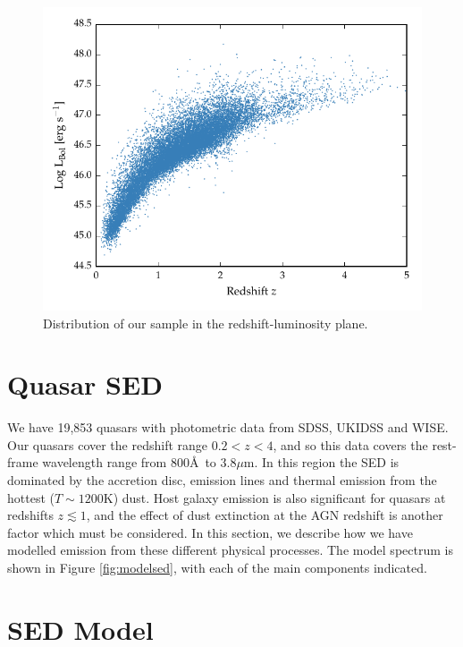 \begin{figure}
  \centering
  \includegraphics[width=\textwidth]{figures/chapter05/lum_z.pdf}
  \caption{Distribution of our sample in the redshift-luminosity plane.}
  \label{fig:lum_z}
\end{figure}


\section{Quasar SED}

We have 19,853 quasars with photometric data from SDSS, UKIDSS and WISE. 
Our quasars cover the redshift range $0.2 < z < 4$, and so this data covers the rest-frame wavelength range from 800\AA\, to 3.8$\mu$m. 
In this region the \ac{SED} is dominated by the accretion disc, emission lines and thermal emission from the hottest ($T\sim1200$K) dust. 
Host galaxy emission is also significant for quasars at redshifts $z\lesssim1$, and the effect of dust extinction at the \ac{AGN} redshift is another factor which must be considered.   
In this section, we describe how we have modelled emission from these different physical processes. 
The model spectrum is shown in Figure \ref{fig:modelsed}, with each of the main components indicated. 

\section{SED Model}


